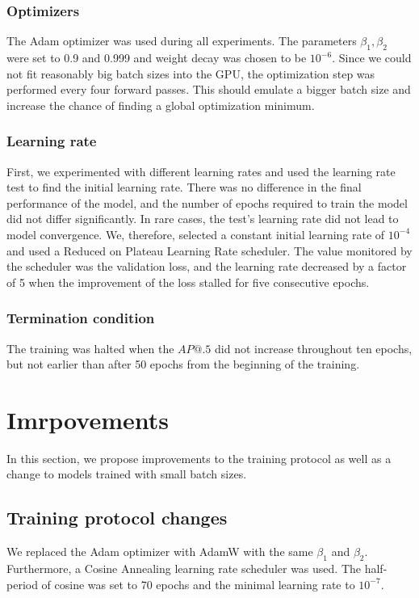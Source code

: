\subsubsection{Optimizers}
The Adam optimizer was used during all experiments. The parameters $\beta_1, \beta_2$ were set to 0.9 and 0.999 and weight decay was chosen to be $10^{-6}$. Since we could not fit reasonably big batch sizes into the GPU, the optimization step was performed every four forward passes. This should emulate a bigger batch size and increase the chance of finding a global optimization minimum.

\subsubsection{Learning rate}
First, we experimented with different learning rates and used the learning rate test to find the initial learning rate. There was no difference in the final performance of the model, and the number of epochs required to train the model did not differ significantly. In rare cases, the test's learning rate did not lead to model convergence. We, therefore, selected a constant initial learning rate of $10^{-4}$ and used a Reduced on Plateau Learning Rate scheduler. The value monitored by the scheduler was the validation loss, and the learning rate decreased by a factor of 5 when the improvement of the loss stalled for five consecutive epochs.
\subsubsection{Termination condition}
The training was halted when the $AP@.5$ did not increase throughout ten epochs, but not earlier than after 50 epochs from the beginning of the training.

\section{Imrpovements}
\label{sec:methods:improvements}
In this section, we propose improvements to the training protocol as well as a change to models trained with small batch sizes.
\subsection{Training protocol changes}
\label{sec:general_changes}
We replaced the Adam optimizer with AdamW with the same $\beta_1$ and $\beta_2$. Furthermore, a Cosine Annealing learning rate scheduler was used. The half-period of cosine was set to 70 epochs and the minimal learning rate to $10^{-7}$.

